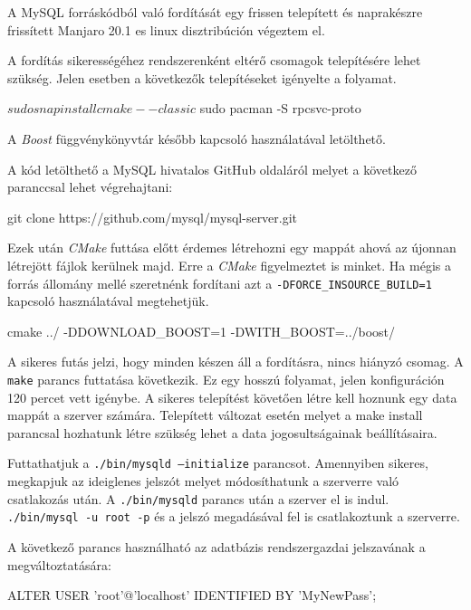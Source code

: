 

A MySQL forráskódból való fordítását egy frissen telepített és naprakészre frissített Manjaro 20.1 es linux disztribúción végeztem el.

A fordítás sikerességéhez rendszerenként eltérő csomagok telepítésére lehet szükség. Jelen esetben a következők telepítéseket igényelte a folyamat.
\begin{python}
$ sudo snap install cmake --classic
$ sudo pacman -S rpcsvc-proto
\end{python}
A \textit{Boost} függvénykönyvtár később kapcsoló használatával letölthető.

A kód letölthető a MySQL hivatalos GitHub oldaláról melyet a következő paranccsal lehet végrehajtani:
\begin{python}
git clone https://github.com/mysql/mysql-server.git
\end{python}

Ezek után \textit{CMake} futtása előtt érdemes létrehozni egy mappát ahová az újonnan létrejött fájlok kerülnek majd. Erre a \textit{CMake} figyelmeztet is minket. Ha mégis a forrás állomány mellé szeretnénk fordítani azt a \texttt{-DFORCE\_INSOURCE\_BUILD=1} kapcsoló használatával megtehetjük.
\begin{python}
cmake ../ -DDOWNLOAD_BOOST=1 -DWITH_BOOST=../boost/
\end{python}
A sikeres futás jelzi, hogy minden készen áll a fordításra, nincs hiányzó csomag. A \texttt{make} parancs futtatása következik. Ez egy hosszú folyamat, jelen konfiguráción 120 percet vett igénybe. A sikeres telepítést követően létre kell hoznunk egy data mappát a szerver számára. Telepített változat esetén melyet a make install parancsal hozhatunk létre szükség lehet a data jogosultságainak beállításaira.

Futtathatjuk a \texttt{./bin/mysqld --initialize} parancsot. Amennyiben sikeres, megkapjuk az ideiglenes jelszót melyet módosíthatunk a szerverre való csatlakozás után. A \texttt{./bin/mysqld} parancs után a szerver el is indul. \texttt{./bin/mysql -u root -p} és a jelszó megadásával fel is csatlakoztunk a szerverre.

A következő parancs használható az adatbázis rendszergazdai jelszavának a megváltoztatására:
\begin{python}
ALTER USER 'root'@'localhost' IDENTIFIED BY 'MyNewPass';
\end{python}
